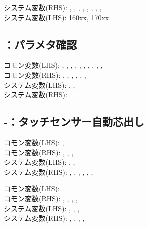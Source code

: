 \begin{hosoku}\small
システム変数(RHS): , , , , , , , , \\
システム変数(LHS): \ttNum160xx, \ttNum170xx
\end{hosoku}

\subsection{：パラメタ確認}
\begin{hosoku}\small
コモン変数(LHS): , , , , , , , , , , \\
コモン変数(RHS): , , , , , , \\
システム変数(LHS): , , \\
システム変数(RHS): 
\end{hosoku}

\subsection{-：タッチセンサー自動芯出し}
\begin{hosoku}\small
コモン変数(LHS): , \\
コモン変数(RHS): , , , \\
システム変数(LHS): , , \\
システム変数(RHS): , , , , , , 
\end{hosoku}

\begin{hosoku}\small
コモン変数(LHS): \\
コモン変数(RHS): , , , , \\
システム変数(LHS): , , , \\
システム変数(RHS): , , , , 
\end{hosoku}


